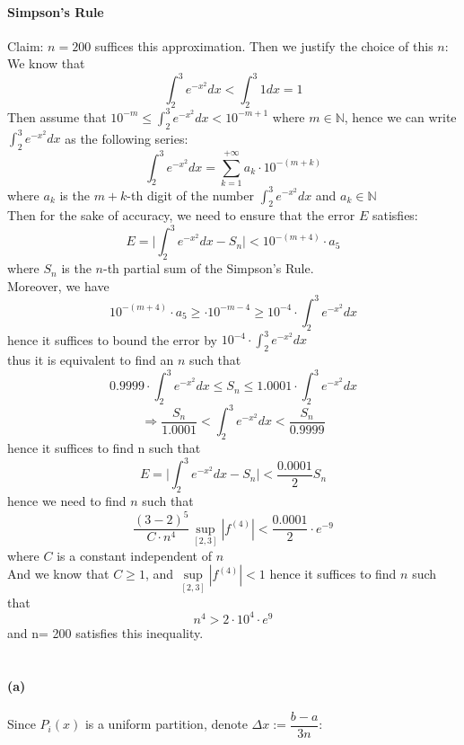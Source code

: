 \documentclass{article}
\def\N{\mathbb{N}}
\def\imply{\Longrightarrow}
\def\oo{\infty}
\begin{document}
\paragraph{Simpson's Rule}
Claim: $n=200$ suffices this approximation. Then we justify the choice of this $n$:\\
We know that $$\int_{2}^{3}e^{-x^2}dx<\int_{2}^{3}1dx=1$$
Then assume that $10^{-m}\le \int_{2}^{3}e^{-x^2}dx<10^{-m+1}$ where $m\in \N$, hence we can write $\int_{2}^{3}e^{-x^2}dx$ as the following series:
$$\int_{2}^{3}e^{-x^2}dx=\sum_{k=1}^{+\oo}a_k\cdot 10^{-(m+k)}$$
where $a_k$ is the $m+k$-th digit of the number $\int_{2}^{3}e^{-x^2}dx$ and $a_k\in \N$\\
Then for the sake of accuracy, we need to ensure that the error $E$ satisfies:
$$E=\big|\int_{2}^{3}e^{-x^2}dx-S_n\big|<10^{-(m+4)}\cdot a_5$$
where $S_n$ is the $n$-th partial sum of the Simpson's Rule.\\
Moreover, we have 
$$10^{-(m+4)}\cdot a_5\ge \cdot 10^{-m-4}\ge 10^{-4}\cdot \int_{2}^{3}e^{-x^2}dx$$ 
hence it suffices to bound the error by $10^{-4}\cdot \int_{2}^{3}e^{-x^2}dx$\\ 
thus it is equivalent to find an $n$ such that
$$0.9999\cdot \int_{2}^{3}e^{-x^2}dx\le S_n\le 1.0001\cdot \int_{2}^{3}e^{-x^2}dx$$
$$\imply \frac{S_n}{1.0001} < \int_{2}^{3}e^{-x^2}dx < \frac{S_n}{0.9999}$$
hence it suffices to find n such that
$$E=\big|\int_{2}^{3}e^{-x^2}dx-S_n\big|<\frac{0.0001}{2}S_n$$
hence we need to find $n$ such that
$$\frac{(3-2)^5}{C\cdot n^4}\sup\limits_{[2,3]}|f^{(4)}|<\frac{0.0001}{2}\cdot e^{-9}$$
where $C$ is a constant independent of $n$\\
And we know that $C\ge 1$, and $\sup\limits_{[2, 3]}|f^{(4)}|<1$ hence it suffices to find $n$ such that
$$n^4>2\cdot 10^4\cdot e^9$$
and n= 200 satisfies this inequality.\\


\section{}
\paragraph{(a)}
Since $P_i(x)$ is a uniform partition, denote $\Delta x := \dfrac{b-a}{3n}$:
\end{document}
